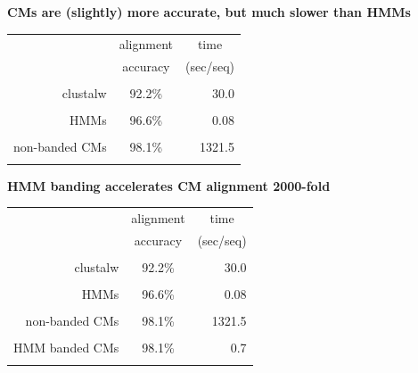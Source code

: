 \documentclass[landscape]{slides}
\begin{document}
\begin{slide}
\begin{center}

\textbf{CMs are (slightly) more accurate, but much slower than HMMs}
\end{center}
\medskip
\medskip
\begin{center}

\begin{tabular}{rcr} 
& \multicolumn{1}{c}{alignment} & \multicolumn{1}{c}{time} \\
& \multicolumn{1}{c}{accuracy} & \multicolumn{1}{c}{(sec/seq)} \\ \hline
& \multicolumn{1}{c}{} & \multicolumn{1}{c}{} \\
clustalw & 92.2\% & 30.0 \\ 
& \multicolumn{1}{c}{} & \multicolumn{1}{c}{} \\
HMMs & 96.6\% & 0.08 \\ 
& \multicolumn{1}{c}{} & \multicolumn{1}{c}{} \\
non-banded CMs & 98.1\% & 1321.5 \\ 
& \multicolumn{1}{c}{} & \multicolumn{1}{c}{} \\
\end{tabular}
\end{center}

\vfill
\end{slide}
\begin{slide}
\begin{center}

\textbf{HMM banding accelerates CM alignment 2000-fold}
\end{center}
\medskip
\medskip
\begin{center}

\begin{tabular}{rcr} 
& \multicolumn{1}{c}{alignment} & \multicolumn{1}{c}{time} \\
& \multicolumn{1}{c}{accuracy} & \multicolumn{1}{c}{(sec/seq)} \\ \hline
& \multicolumn{1}{c}{} & \multicolumn{1}{c}{} \\
clustalw & 92.2\% & 30.0 \\ 
& \multicolumn{1}{c}{} & \multicolumn{1}{c}{} \\
HMMs & 96.6\% & 0.08 \\ 
& \multicolumn{1}{c}{} & \multicolumn{1}{c}{} \\
non-banded CMs & 98.1\% & 1321.5 \\ 
& \multicolumn{1}{c}{} & \multicolumn{1}{c}{} \\
HMM banded CMs & 98.1\% & 0.7 \\ %
& \multicolumn{1}{c}{} & \multicolumn{1}{c}{} \\
\end{tabular}
\end{center}

\vfill
\end{slide}
\end{document}
